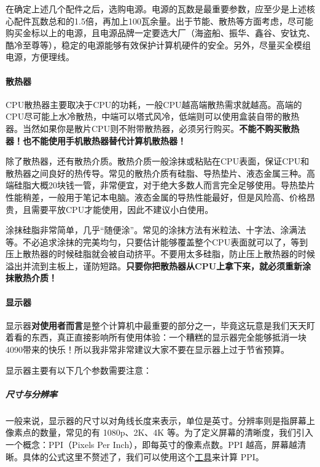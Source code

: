 在确定上述几个配件之后，选购电源。电源的瓦数是最重要参数，应至少是上述核心配件瓦数总和的1.5倍，再加上100瓦余量。出于节能、散热等方面考虑，尽可能购买金标以上的电源，且电源品牌一定要选大厂（海盗船、振华、鑫谷、安钛克、酷冷至尊等），稳定的电源能够有效保护计算机硬件的安全。另外，尽量买全模组电源，方便理线。

\paragraph{散热器}

CPU散热器主要取决于CPU的功耗，一般CPU越高端散热需求就越高。高端的CPU尽可能上水冷散热，中端可以塔式风冷，低端则可以使用盒装自带的散热器。当然如果你是散片CPU则不附带散热器，必须另行购买。\textbf{不能不购买散热器！也不能使用手机散热器替代计算机散热器！}

除了散热器，还有散热介质。散热介质一般涂抹或粘贴在CPU表面，保证CPU和散热器之间良好的热传导。常见的散热介质有硅脂、导热垫片、液态金属三种。高端硅脂大概20块钱一管，非常便宜，对于绝大多数人而言完全足够使用。导热垫片性能稍差，一般用于笔记本电脑。液态金属的导热性能最好，但是风险高、价格昂贵，且需要平放CPU才能使用，因此不建议小白使用。

涂抹硅脂非常简单，几乎“随便涂”。常见的涂抹方法有米粒法、十字法、涂满法等。不必追求涂抹的完美均匀，只要估计能够覆盖整个CPU表面就可以了，等到压上散热器的时候硅脂就会被自动挤平。不要用太多硅脂，防止压上散热器的时候溢出并流到主板上，谨防短路。\textbf{只要你把散热器从CPU上拿下来，就必须重新涂抹散热介质！}

\paragraph{显示器}

显示器\textbf{对使用者而言}是整个计算机中最重要的部分之一，毕竟这玩意是我们天天盯着看的东西，真正直接影响所有使用体验：一个糟糕的显示器完全能够抵消一块4090带来的快乐！所以我非常非常建议大家不要在显示器上过于节省预算。

显示器主要有以下几个参数需要注意：

\subparagraph{尺寸与分辨率}

一般来说，显示器的尺寸以对角线长度来表示，单位是英寸。分辨率则是指屏幕上像素点的数量，常见的有 1080p、2K、4K 等。为了定义屏幕的清晰度，我们引入一个概念：PPI（Pixels Per Inch），即每英寸的像素点数。PPI 越高，屏幕越清晰。具体的公式这里不赘述了，我们可以使用这个\href{https://config.net.cn/tools/PixelToPpi.html}{工具}来计算 PPI。

